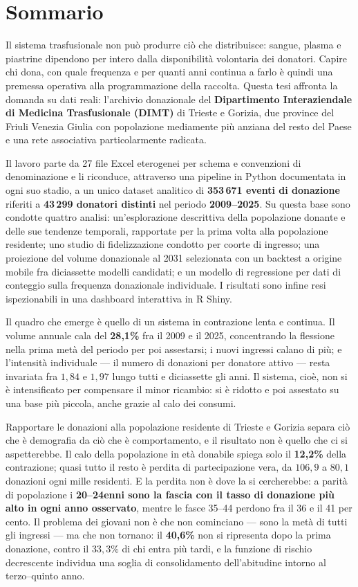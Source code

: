 \chapter{Sommario}

Il sistema trasfusionale non può produrre ciò che distribuisce: sangue, plasma
e piastrine dipendono per intero dalla disponibilità volontaria dei donatori.
Capire chi dona, con quale frequenza e per quanti anni continua a farlo è
quindi una premessa operativa alla programmazione della raccolta.
Questa tesi affronta la domanda su dati reali:
l'archivio donazionale del \textbf{Dipartimento Interaziendale di Medicina
Trasfusionale (DIMT)} di Trieste e Gorizia, due province del Friuli Venezia
Giulia con popolazione mediamente più anziana del resto del Paese e una rete
associativa particolarmente radicata.

Il lavoro parte da 27 file Excel eterogenei per schema e convenzioni di
denominazione e li riconduce, attraverso una pipeline in Python documentata in
ogni suo stadio, a un unico dataset analitico di \textbf{353\,671 eventi di
donazione} riferiti a \textbf{43\,299 donatori distinti} nel periodo
\textbf{2009--2025}. Su questa base sono condotte quattro analisi:
un'esplorazione descrittiva della popolazione donante e delle sue tendenze
temporali, rapportate per la prima volta alla popolazione residente; uno studio
di fidelizzazione condotto per coorte di ingresso; una proiezione del volume
donazionale al 2031 selezionata con un backtest a origine mobile fra diciassette
modelli candidati; e un modello di regressione per dati di conteggio sulla
frequenza donazionale individuale. I risultati sono infine resi ispezionabili
in una dashboard interattiva in R Shiny.

Il quadro che emerge è quello di un sistema in contrazione lenta e continua. Il
volume annuale cala del \textbf{28{,}1\%} fra il 2009 e il 2025, concentrando
la flessione nella prima metà del periodo per poi assestarsi; i nuovi ingressi
calano di più; e l'intensità individuale --- il numero di donazioni per
donatore attivo --- resta invariata fra $1{,}84$ e $1{,}97$ lungo tutti e
diciassette gli anni. Il sistema, cioè, non si è intensificato per compensare
il minor ricambio: si è ridotto e poi assestato su una base più piccola, anche grazie
al calo dei consumi.

Rapportare le donazioni alla popolazione residente di Trieste e Gorizia separa
ciò che è demografia da ciò che è comportamento, e il risultato non è quello
che ci si aspetterebbe. Il calo della popolazione in età donabile spiega solo
il \textbf{12{,}2\%} della contrazione; quasi tutto il resto è perdita di
partecipazione vera, da $106{,}9$ a $80{,}1$ donazioni ogni mille residenti. E
la perdita non è dove la
si cercherebbe: a parità di popolazione i \textbf{20--24enni sono la fascia con
il tasso di donazione più alto in ogni anno osservato}, mentre le fasce 35--44
perdono fra il 36 e il 41 per cento. Il problema dei giovani non è che non
cominciano --- sono la metà di tutti gli ingressi --- ma che non tornano: il
\textbf{40{,}6\%} non si ripresenta dopo la prima donazione, contro il
$33{,}3\%$ di chi entra più tardi, e la funzione di rischio decrescente
individua una soglia di consolidamento dell'abitudine intorno al terzo--quinto
anno.

